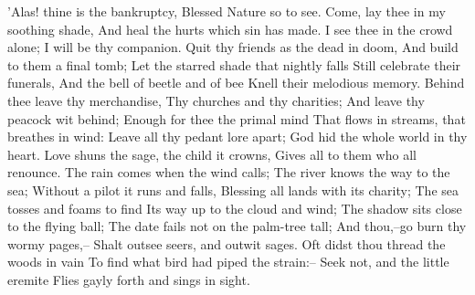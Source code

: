 'Alas! thine is the bankruptcy,
Blessed Nature so to see.
Come, lay thee in my soothing shade,
And heal the hurts which sin has made.
I see thee in the crowd alone;
I will be thy companion.
Quit thy friends as the dead in doom,
And build to them a final tomb;
Let the starred shade that nightly falls
Still celebrate their funerals,
And the bell of beetle and of bee
Knell their melodious memory.
Behind thee leave thy merchandise,
Thy churches and thy charities;
And leave thy peacock wit behind;
Enough for thee the primal mind
That flows in streams, that breathes in wind:
Leave all thy pedant lore apart;
God hid the whole world in thy heart.
Love shuns the sage, the child it crowns,
Gives all to them who all renounce.
The rain comes when the wind calls;
The river knows the way to the sea;
Without a pilot it runs and falls,
Blessing all lands with its charity;
The sea tosses and foams to find
Its way up to the cloud and wind;
The shadow sits close to the flying ball;
The date fails not on the palm-tree tall;
And thou,--go burn thy wormy pages,--
Shalt outsee seers, and outwit sages.
Oft didst thou thread the woods in vain
To find what bird had piped the strain:--
Seek not, and the little eremite
Flies gayly forth and sings in sight.

